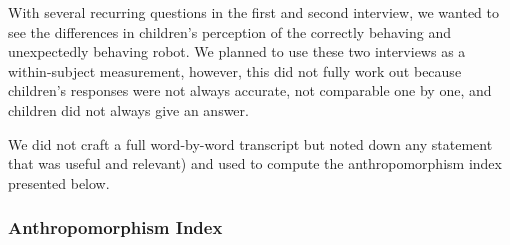 \documentclass{sig-alternate}
\newcommand{\eg}{{\textit{e.g.~}}}
\begin{document}
With several recurring questions in the first and second interview, we wanted to
see the differences in children's perception of the correctly behaving and
unexpectedly behaving robot. We planned to use these two interviews as a
within-subject measurement, however, this did not fully work out because
children's responses were not always accurate, not comparable one by one, and
children did not always give an answer.	



We did not craft a full word-by-word transcript but
noted down any statement that was useful and relevant) and used to compute the
anthropomorphism index presented below.

\subsubsection{Anthropomorphism Index}

%
%
\end{document}
